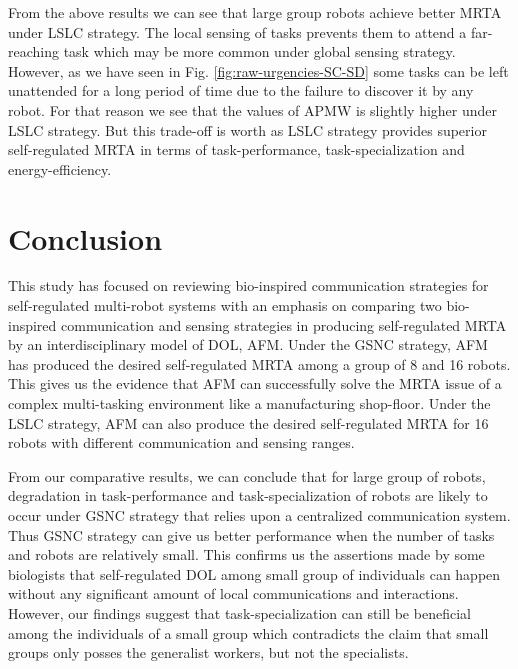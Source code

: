 \documentclass{intech}
\begin{document}
From the above results we can see that large group robots achieve better MRTA under LSLC strategy. The local sensing of tasks prevents them to attend a far-reaching task which may be more common under global sensing strategy. However, as we have seen in Fig. \ref{fig:raw-urgencies-SC-SD}
some tasks can be left unattended for a long period of time due to the failure to discover it by any robot. For that reason we see that the values of APMW is slightly higher under LSLC strategy. But this trade-off is worth as LSLC strategy provides superior self-regulated MRTA in terms of task-performance, task-specialization and energy-efficiency.
\section{Conclusion}
This study has focused on reviewing bio-inspired communication strategies for self-regulated multi-robot systems with an emphasis on comparing two bio-inspired  communication and sensing strategies in producing self-regulated MRTA by an interdisciplinary model of DOL, AFM. Under the GSNC strategy, AFM has produced the desired self-regulated MRTA among a group of 8 and 16 robots. This gives us the evidence that AFM can successfully solve the MRTA issue of a complex multi-tasking environment like a manufacturing shop-floor. Under the LSLC strategy, AFM can also produce the desired self-regulated MRTA for 16 robots with different communication and sensing ranges.

From our comparative results, we can conclude that for large group of robots,  degradation in  task-performance and task-specialization of robots are likely to occur  under GSNC strategy that relies upon a centralized communication system. Thus GSNC strategy can give us better performance when the number of tasks and robots are relatively small. This confirms us the assertions made by some biologists that self-regulated DOL among small group of individuals can happen without any significant amount of local communications and interactions. However, our findings suggest that task-specialization can still be beneficial among the individuals of a small group which contradicts the claim that small groups only posses the generalist workers, but not the specialists.
\end{document}
